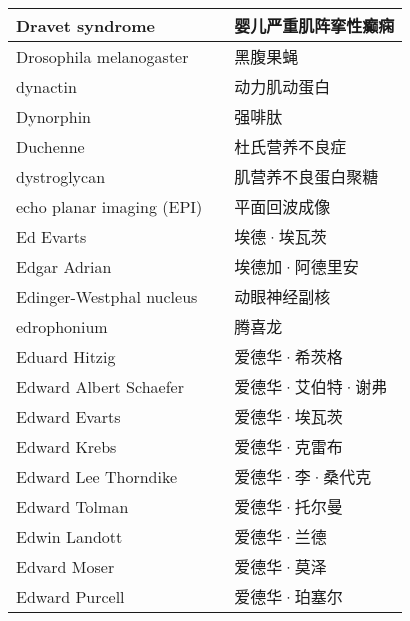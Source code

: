 \begin{longtable}{lll}
	\midrule
	Dravet syndrome     &&  婴儿严重肌阵挛性癫痫  \\
	
	\midrule
	Drosophila melanogaster     &&  黑腹果蝇  \\
	
	\midrule
	dynactin     &&  动力肌动蛋白  \\
	
	\midrule
	Dynorphin     &&  强啡肽  \\
	
	\midrule
	Duchenne     &&  杜氏营养不良症  \\
	
	\midrule
	dystroglycan     &&  肌营养不良蛋白聚糖  \\
	
	\midrule
	echo planar imaging (EPI)     &&  平面回波成像  \\
	
	\midrule
	Ed Evarts     &&  埃德·埃瓦茨  \\
	
	\midrule
	Edgar Adrian     &&  埃德加·阿德里安  \\
	
	\midrule
	Edinger-Westphal nucleus     &&  动眼神经副核  \\
	
	\midrule
	edrophonium     &&  腾喜龙  \\
	
	\midrule
	Eduard Hitzig     &&  爱德华·希茨格  \\
	
	\midrule
	Edward Albert Schaefer     &&  爱德华·艾伯特·谢弗  \\
	
	\midrule
	Edward Evarts     &&  爱德华·埃瓦茨  \\
	
	\midrule
	Edward Krebs     &&  爱德华·克雷布  \\
	
	\midrule
	Edward Lee Thorndike     &&  爱德华·李·桑代克  \\
	
	\midrule
	Edward Tolman     &&  爱德华·托尔曼  \\
	
	\midrule
	Edwin Landott     &&  爱德华·兰德  \\
	
	\midrule
	Edvard Moser     &&  爱德华·莫泽  \\
	
	\midrule
	Edward Purcell     &&  爱德华·珀塞尔  \\
	

\end{longtable}
